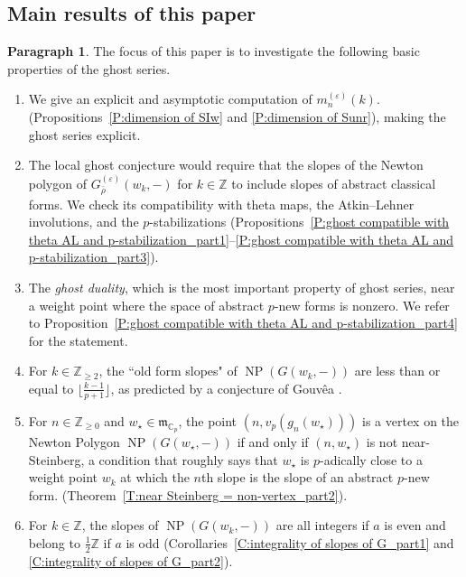 \documentclass[12pt]{amsart}
\theoremstyle{definition}
\newtheorem{para}[subsection]{Paragraph}
\numberwithin{equation}{subsection}
\def\gothm{\mathfrak{m}}
\def\CC{\mathbb{C}}
\def\ZZ{\mathbb{Z}}
\DeclareMathOperator{\NP}{NP}
\begin{document}
\subsection{Main results of this paper}
\label{S:main result summarized}
\begin{para}
\label{P:para_019}
The focus of this paper is to investigate the following basic properties of the ghost series.
\begin{enumerate}
\item 
We give an explicit and asymptotic computation of $m_n^{(\varepsilon)}(k)$. (Propositions~\ref{P:dimension of SIw} and \ref{P:dimension of Sunr}), making the ghost series explicit.
\item 
The local ghost conjecture would require that the slopes of the Newton polygon of $G_{\bar \rho}^{(\varepsilon)}(w_k, -)$ for $k \in \ZZ$ to include slopes of abstract classical forms. We check its compatibility with theta maps,  the Atkin--Lehner involutions, and the $p$-stabilizations (Propositions~\ref{P:ghost compatible with theta AL and p-stabilization_part1}--\ref{P:ghost compatible with theta AL and p-stabilization_part3}).  
 \item
The \emph{ghost duality}, which is the most important property of ghost series, near a weight point where the space of abstract $p$-new forms  is nonzero. We refer to Proposition~\ref{P:ghost compatible with theta AL and p-stabilization_part4} for the statement.
\item For $k \in \ZZ_{\geq 2}$, the ``old form slopes" of $\NP(G(w_k,-))$ are less than or equal to $\big\lfloor\frac{k-1}{p+1}\big\rfloor$, as predicted by a conjecture of Gouv\^ea \cite{gouvea}.

\item  For $n \in \ZZ_{\geq 0}$ and $w_\star \in \gothm_{\CC_p}$, the point $(n, v_p(g_n(w_\star)))$ is a vertex on the Newton Polygon $\NP(G(w_\star, -))$ if and only if $(n, w_\star)$ is not near-Steinberg, a condition that roughly says that $w_\star$ is $p$-adically close to a weight point $w_k$ at which the $n$th slope is the slope of an abstract $p$-new form. (Theorem~\ref{T:near Steinberg = non-vertex_part2}). 

\item For $k \in \ZZ$, the slopes of $\NP(G(w_k,-))$ are all integers if $a$ is even and belong to $\frac 12\ZZ$ if $a$ is odd (Corollaries~\ref{C:integrality of slopes of G_part1} and \ref{C:integrality of slopes of G_part2}). 
\end{enumerate}
\end{para}
\end{document}
